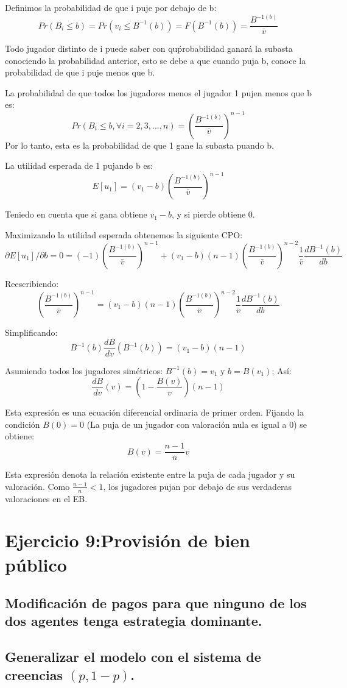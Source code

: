 \documentclass{article}
\theoremstyle{definition}
\theoremstyle{remark}
\begin{document}
\begin{Schunk}
\begin{Soutput}
Definimos la probabilidad de que i puje por debajo de b:
$$Pr(B_i\leq b)=Pr(v_i\leq B^{-1}(b))=F(B^{-1}(b))=\frac{B^{-1(b)}}{\bar{v}}$$

Todo jugador distinto de i puede saber con qu\'probabilidad ganar\'a la subasta conociendo la probabilidad anterior, esto se debe a que cuando puja b, conoce la probabilidad de que i puje menos que b.

La probabilidad de que todos los jugadores menos el jugador 1 pujen menos que b es:
$$Pr(B_i\leq b, \forall i=2,3,...,n)=(\frac{B^{-1(b)}}{\bar{v}})^{n-1}$$
 Por lo tanto, esta es la probabilidad de que 1 gane la subasta puando b.

La utilidad esperada de 1 pujando b es:
$$E[u_1]=(v_1-b)(\frac{B^{-1(b)}}{\bar{v}})^{n-1}$$

Teniedo en cuenta que si gana obtiene $v_1-b$, y si pierde obtiene 0.

Maximizando la utilidad esperada obtenemos la siguiente CPO:
$$\partial E[u_1]/\partial b=0=(-1)(\frac{B^{-1(b)}}{\bar{v}})^{n-1}+(v_1-b)(n-1)(\frac{B^{-1(b)}}{\bar{v}})^{n-2}\frac{1}{\bar{v}}\frac{dB^{-1}(b)}{db}$$

Reescribiendo:
$$(\frac{B^{-1(b)}}{\bar{v}})^{n-1}=(v_1-b)(n-1)(\frac{B^{-1(b)}}{\bar{v}})^{n-2}\frac{1}{\bar{v}}\frac{dB^{-1}(b)}{db}$$

Simplificando:
$$B^{-1}(b)\frac{dB}{dv}(B^{-1}(b))=(v_1-b)(n-1)$$

Asumiendo todos los jugadores sim\'etricos: $B^{-1}(b)=v_1$ y $b=B(v_1)$; As\'i:
$$\frac{dB}{dv}(v)=(1-\frac{B(v)}{v})(n-1)$$

Esta expresi\'on es una ecuaci\'on diferencial ordinaria de primer orden. Fijando la condici\'on $B(0)=0$ (La puja de un jugador con valoraci\'on nula es igual a 0) se obtiene:
$$B(v)=\frac{n-1}{n}v$$

Esta expresi\'on denota la relaci\'on existente entre la puja de cada jugador y su valoraci\'on. Como $\frac{n-1}{n}<1$, los jugadores pujan por debajo de sus verdaderas valoraciones en el EB.

\section{Ejercicio 9:Provisi\'on de bien p\'ublico}
\subsection{Modificaci\'on de pagos para que ninguno de los dos agentes tenga estrategia dominante.}
\subsection{Generalizar el modelo con el sistema de creencias $(p,1-p)$.}

\end{Soutput}
\end{Schunk}
\end{document}
